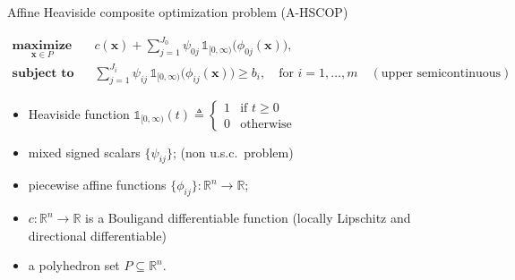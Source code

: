 \documentclass[aspectratio=169,xcolor=dvipsnames]{beamer}
\begin{document}
\begin{frame}{Affine Heaviside composite optimization problem (A-HSCOP)}
  \small
  \setlength{\abovedisplayskip}{5pt}
  \setlength{\belowdisplayskip}{5pt}

  \[
    \begin{aligned}
      \operatorname*{\textbf{maximize}}_{\mathbf{x}\in P}\quad
      &c(\mathbf{x})+\sum_{j=1}^{J_0}\psi_{0j}\,
        \mathds{1}_{[0,\infty)}\bigl(\phi_{0j}(\mathbf{x})\bigr),\\[2pt]
      \operatorname*{\textbf{subject to}}\quad
      &\sum_{j=1}^{J_i}\psi_{ij}\,
        \mathds{1}_{[0,\infty)}\bigl(\phi_{ij}(\mathbf{x})\bigr)\geq b_i,
        \quad\text{for }i=1,\ldots,m
        \quad(\text{upper semicontinuous})
    \end{aligned}
  \]

  \begin{itemize}
    \setlength{\itemsep}{0.08cm}
    \item Heaviside function $\mathds{1}_{[0,\infty)}(t)\triangleq
      \begin{cases}1 & \text{if }t\geq 0\\ 0 & \text{otherwise}\end{cases}$
    \item mixed signed scalars $\{\psi_{ij}\}$;\quad
      \textcolor{MediumRed}{(non u.s.c.\ problem)}
    \item piecewise affine functions $\{\phi_{ij}\}:\mathbb{R}^n\to\mathbb{R}$;
    \item $c:\mathbb{R}^n\to\mathbb{R}$ is a Bouligand differentiable function
      (locally Lipschitz and directional differentiable)
    \item a polyhedron set $P\subseteq\mathbb{R}^n$.
  \end{itemize}
\end{frame}
\end{document}
